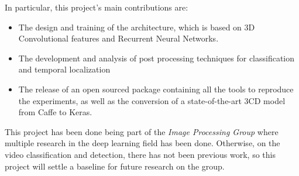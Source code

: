 In particular, this project's main contributions are:
\begin{itemize}
	\item The design and training of the architecture, which is based on 3D Convolutional features and Recurrent Neural Networks.
    \item The development and analysis of post processing techniques for classification and temporal localization
    \item The release of an open sourced package containing all the tools to reproduce the experiments, as well as the conversion of a state-of-the-art 3CD model from Caffe to Keras.
    
\end{itemize}


This project has been done being part of the \textit{Image Processing Group} where multiple research in the deep learning field has been done. Otherwise, on the video classification and detection, there has not been previous work, so this project will settle a baseline for future research on the group. 


